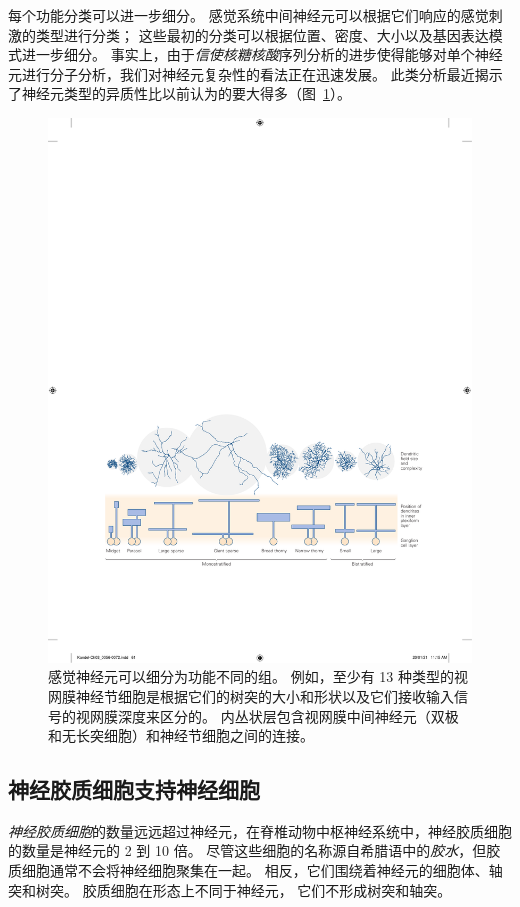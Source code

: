 每个功能分类可以进一步细分。 
感觉系统中间神经元可以根据它们响应的感觉刺激的类型进行分类； 
这些最初的分类可以根据位置、密度、大小以及基因表达模式进一步细分。
事实上，由于\textit{信使核糖核酸}序列分析的进步使得能够对单个神经元进行分子分析，我们对神经元复杂性的看法正在迅速发展。 
此类分析最近揭示了神经元类型的异质性比以前认为的要大得多（图~\ref{fig:3_4}）。


\begin{figure}[htbp]
	\centering
	\includegraphics[width=1.0\linewidth]{chap03/fig_3_4}
	\caption{感觉神经元可以细分为功能不同的组。
		例如，至少有 13 种类型的视网膜神经节细胞是根据它们的树突的大小和形状以及它们接收输入信号的视网膜深度来区分的。
		内丛状层包含视网膜中间神经元（双极和无长突细胞）和神经节细胞之间的连接\cite{dacey2003fireworks}。}
	\label{fig:3_4}
\end{figure}


\subsection{神经胶质细胞支持神经细胞}
\textit{神经胶质细胞}的数量远远超过神经元，在脊椎动物中枢神经系统中，神经胶质细胞的数量是神经元的 2 到 10 倍。
尽管这些细胞的名称源自希腊语中的\textit{胶水}，但胶质细胞通常不会将神经细胞聚集在一起。
相反，它们围绕着神经元的细胞体、轴突和树突。
胶质细胞在形态上不同于神经元，
它们不形成树突和轴突。


